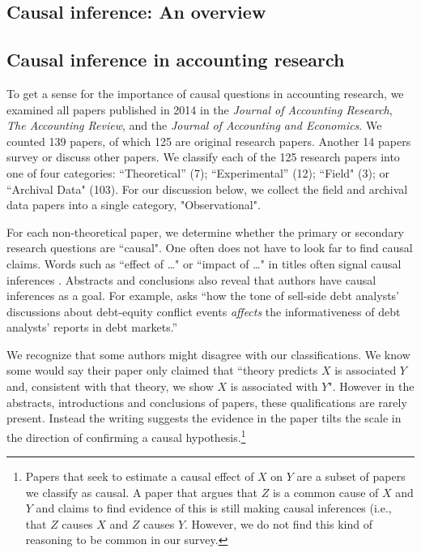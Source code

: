 \documentclass[11pt,reqno,titlepage]{amsart}
\begin{document}
\begin{doublespace}
\section{Causal inference: An overview} \label{sec:causal}

\subsection{Causal inference in accounting research}


To get a sense for the importance of causal questions in accounting research,
we examined all papers published in 2014 in the \textit{Journal of Accounting Research}, \textit{The Accounting Review}, and the \textit{Journal of Accounting and Economics}.
We counted 139 papers, of which 125 are original research papers. Another 14 papers survey or discuss other papers.
We classify each of the 125 research papers into one of four categories:  ``Theoretical'' (7); ``Experimental'' (12); ``Field" (3); or ``Archival Data" (103). 
For our discussion below, we collect the field and archival data papers into a single category, "Observational".

For each non-theoretical paper, we determine whether the primary or secondary research questions are ``causal". One often does not have to look far to find causal claims. Words
such as ``effect of \dots" or ``impact of \dots" in titles often signal causal inferences   
\citep[e.g.][]{Cohen:2014jl,Clorproell:2014cv}. 
Abstracts and conclusions also reveal that authors have causal inferences as a goal. 
For example, \citet{deFranco:2014ct} asks ``how the tone of sell-side debt analysts' discussions about debt-equity conflict events \emph{affects} the informativeness of debt analysts' reports in debt markets.''

We recognize that some authors might disagree with our classifications.
We know some would say their paper only claimed that ``theory predicts $X$ is associated $Y$ and, consistent with that theory, we show $X$ is associated with $Y$".
However in the abstracts, introductions and conclusions of papers, these qualifications are rarely present. 
Instead the writing suggests the evidence in the paper tilts the scale in the direction of confirming a causal hypothesis.\footnote{
Papers that seek to estimate a causal effect of $X$ on $Y$ are a subset of papers we classify as causal.
A paper that argues that $Z$ is a common cause of $X$ and $Y$ and claims to find evidence of this is still making causal inferences (i.e., that $Z$ causes $X$ and $Z$ causes $Y$.
However, we do not find this kind of reasoning to be common in our survey.}


\end{doublespace}
\end{document}
